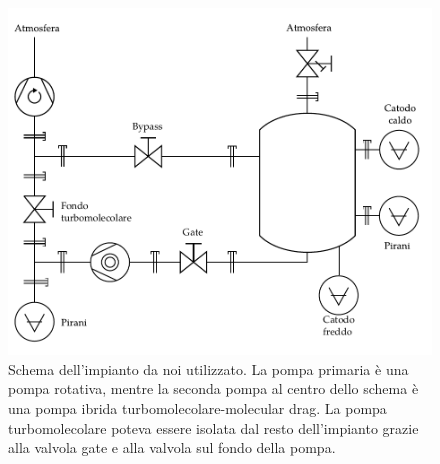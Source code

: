 \documentclass[11pt, twoside, a4paper]{article}
\begin{document}



\newpage
\begin{figure}[b!]
    \centering
   \includegraphics[width=16cm]{drawing.pdf}
   \caption{Schema dell'impianto da noi utilizzato. La pompa primaria è una pompa rotativa, mentre la seconda pompa al centro dello schema è una pompa ibrida turbomolecolare-molecular drag.
   La pompa turbomolecolare poteva essere isolata dal resto dell'impianto grazie alla valvola gate e alla valvola sul fondo della pompa.}
   \label{fig:impianto}
\end{figure}
\end{document}
